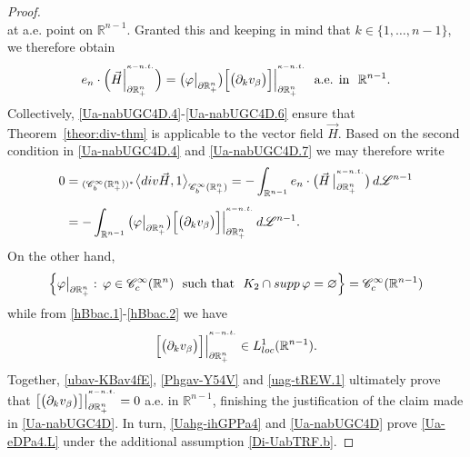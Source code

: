 \documentclass[10pt,a4paper]{amsart}
\begin{document}
\begin{proof}
\begin{equation}
\end{equation}
%
at a.e. point on ${\mathbb{R}}^{n-1}$.
Granted this and keeping in mind that $k\in\{1,\dots,n-1\}$, 
we therefore obtain 
%
\begin{equation}\label{Ua-nabUGC4D.7}
e_n\cdot\Big(\vec{H}\Big|_{\partial\mathbb{R}^{n}_{+}}^{{}^{\kappa-{\rm n.t.}}}\Big)
=\big(\varphi\big|_{\partial\mathbb{R}^{n}_{+}}\big)
\Big[\big(\partial_k v_{\beta}\big)\Big]
\Big|_{\partial\mathbb{R}^{n}_{+}}^{{}^{\kappa-{\rm n.t.}}}
\,\,\text{ a.e. in }\,\,{\mathbb{R}}^{n-1}.
\end{equation}
%
Collectively, \eqref{Ua-nabUGC4D.4}-\eqref{Ua-nabUGC4D.6} ensure that 
Theorem~\ref{theor:div-thm} is applicable to the vector field $\vec{H}$. 
Based on the second condition in \eqref{Ua-nabUGC4D.4} and \eqref{Ua-nabUGC4D.7} 
we may therefore write 
%
\begin{align}\label{Phgav-Y54V}
0 & ={}_{(\mathscr{C}_b^\infty(\mathbb{R}^n_+))^*}\big\langle{\rm div}\vec{H},1
\big\rangle_{\mathscr{C}_b^\infty(\mathbb{R}^n_+)} 
=-\int_{\mathbb{R}^{n-1}}e_n\cdot
\big(\vec{H}\,\big|^{{}^{\kappa-{\rm n.t.}}}_{\partial\mathbb{R}^n_+}\big)\,d{\mathscr{L}}^{n-1}
\nonumber\\[4pt]
&=-\int_{\mathbb{R}^{n-1}}\big(\varphi\big|_{\partial\mathbb{R}^{n}_{+}}\big)
\Big[\big(\partial_k v_{\beta}\big)
\Big]\Big|_{\partial\mathbb{R}^{n}_{+}}^{{}^{\kappa-{\rm n.t.}}}\,d{\mathscr{L}}^{n-1}.
\end{align}
%
On the other hand, 
%
\begin{equation}\label{uag-tREW.1}
\Big\{\varphi\big|_{\partial\mathbb{R}^{n}_{+}}:\,
\varphi\in{\mathscr{C}}^\infty_c({\mathbb{R}}^n)\,\,
\text{ such that }\,\,K_2\cap{\rm supp}\,\varphi=\varnothing\Big\}
={\mathscr{C}}^\infty_c({\mathbb{R}}^{n-1})
\end{equation}
%
while from \eqref{hBbac.1}-\eqref{hBbac.2} we have 
%
\begin{equation}\label{ubav-KBav4fE}
\Big[\big(\partial_k v_{\beta}\big)
\Big]\Big|_{\partial\mathbb{R}^{n}_{+}}^{{}^{\kappa-{\rm n.t.}}}\in L^1_{\rm loc}({\mathbb{R}}^{n-1}).
\end{equation}
%
Together, \eqref{ubav-KBav4fE}, \eqref{Phgav-Y54V} and \eqref{uag-tREW.1} 
ultimately prove that $\big[\big(\partial_k v_{\beta}\big)\big]
\big|_{\partial\mathbb{R}^{n}_{+}}^{{}^{\kappa-{\rm n.t.}}}=0$ a.e. in ${\mathbb{R}}^{n-1}$, 
finishing the justification of the claim made in \eqref{Ua-nabUGC4D}. 
In turn, \eqref{Uahg-ihGPPa4} and \eqref{Ua-nabUGC4D} prove \eqref{Ua-eDPa4.L} 
under the additional assumption \eqref{Di-UabTRF.b}. 


\end{proof}
\end{document}
